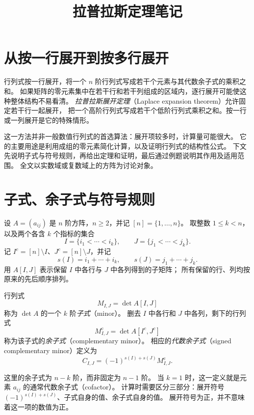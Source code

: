 \documentclass[UTF8,12pt,a4paper,fontset=fandol]{ctexart}
\title{拉普拉斯定理笔记}
\author{}
\date{}
\begin{document}
\maketitle

\section{从按一行展开到按多行展开}

行列式按一行展开，将一个 $n$ 阶行列式写成若干个元素与其代数余子式的乘积之和。
如果矩阵的零元素集中在若干行和若干列组成的区域内，逐行展开可能使这种整体结构不易看清。
\emph{拉普拉斯展开定理}（Laplace expansion theorem）允许固定若干行一起展开，
把一个高阶行列式写成若干个低阶行列式乘积之和。按一行或一列展开是它的特殊情形。

这一方法并非一般数值行列式的首选算法：展开项较多时，计算量可能很大。
它的主要用途是利用成组的零元素简化计算，以及证明行列式的结构性公式。
下文先说明子式与符号规则，再给出定理和证明，最后通过例题说明其作用及适用范围。
全文以实数域或复数域上的方阵为讨论对象。

\section{子式、余子式与符号规则}

设 $A=(a_{ij})$ 是 $n$ 阶方阵，$n\geq2$，并记 $[n]=\{1,\ldots,n\}$。
取整数 $1\leq k<n$，以及两个各含 $k$ 个指标的集合
\[
  I=\{i_1<\cdots<i_k\},\qquad J=\{j_1<\cdots<j_k\}.
\]
记 $I^c=[n]\setminus I$、$J^c=[n]\setminus J$，并记
\[
  s(I)=i_1+\cdots+i_k,\qquad s(J)=j_1+\cdots+j_k.
\]
用 $A[I,J]$ 表示保留 $I$ 中各行与 $J$ 中各列得到的子矩阵；
所有保留的行、列均按原来的先后顺序排列。

\begin{definition}[子式与余子式]
\label{def:laplace-minors}
行列式
\[
  M_{I,J}=\det A[I,J]
\]
称为 $\det A$ 的一个 $k$ 阶\emph{子式}（minor）。
删去 $I$ 中各行和 $J$ 中各列，剩下的行列式
\[
  M^{\mathrm{c}}_{I,J}=\det A[I^c,J^c]
\]
称为该子式的\emph{余子式}（complementary minor）。
相应的\emph{代数余子式}（signed complementary minor）定义为
\begin{equation}
  C_{I,J}=(-1)^{s(I)+s(J)}M^{\mathrm{c}}_{I,J}.
  \label{eq:laplace-cofactor}
\end{equation}
\end{definition}

这里的余子式为 $n-k$ 阶，而非固定为 $n-1$ 阶。
当 $k=1$ 时，这一定义就是元素 $a_{ij}$ 的通常代数余子式（cofactor）。
计算时需要区分三部分：展开符号 $(-1)^{s(I)+s(J)}$、子式自身的值、余子式自身的值。
展开符号为正，并不意味着这一项的数值为正。
\end{document}
